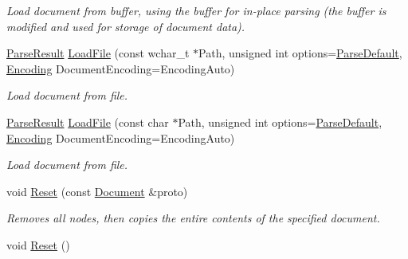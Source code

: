 \begin{DoxyCompactItemize}
\begin{DoxyCompactList}\small\item\em Load document from buffer, using the buffer for in-\/place parsing (the buffer is modified and used for storage of document data). \item\end{DoxyCompactList}\item 
\hyperlink{structphys_1_1xml_1_1ParseResult}{ParseResult} \hyperlink{classphys_1_1xml_1_1Document_a9ac2ad5ecfe73457083c39fb89429673}{LoadFile} (const wchar\_\-t $\ast$Path, unsigned int options=\hyperlink{namespacephys_1_1xml_aa6b8f7f8c2322fd683a235b498834d60}{ParseDefault}, \hyperlink{namespacephys_1_1xml_a420f5de782438f88160321385bea2015}{Encoding} DocumentEncoding=EncodingAuto)
\begin{DoxyCompactList}\small\item\em Load document from file. \item\end{DoxyCompactList}\item 
\hyperlink{structphys_1_1xml_1_1ParseResult}{ParseResult} \hyperlink{classphys_1_1xml_1_1Document_a7f9dfcc3d30347773f92c8d46fe18f9a}{LoadFile} (const char $\ast$Path, unsigned int options=\hyperlink{namespacephys_1_1xml_aa6b8f7f8c2322fd683a235b498834d60}{ParseDefault}, \hyperlink{namespacephys_1_1xml_a420f5de782438f88160321385bea2015}{Encoding} DocumentEncoding=EncodingAuto)
\begin{DoxyCompactList}\small\item\em Load document from file. \item\end{DoxyCompactList}\item 
void \hyperlink{classphys_1_1xml_1_1Document_aba87e21330118fb43b2aab2c36486b03}{Reset} (const \hyperlink{classphys_1_1xml_1_1Document}{Document} \&proto)
\begin{DoxyCompactList}\small\item\em Removes all nodes, then copies the entire contents of the specified document. \item\end{DoxyCompactList}\item 
\hypertarget{classphys_1_1xml_1_1Document_a9ab556271e4a1214ecb35ba6aef9e8e4}{
void \hyperlink{classphys_1_1xml_1_1Document_a9ab556271e4a1214ecb35ba6aef9e8e4}{Reset} ()}
\label{classphys_1_1xml_1_1Document_a9ab556271e4a1214ecb35ba6aef9e8e4}


\end{DoxyCompactItemize}
